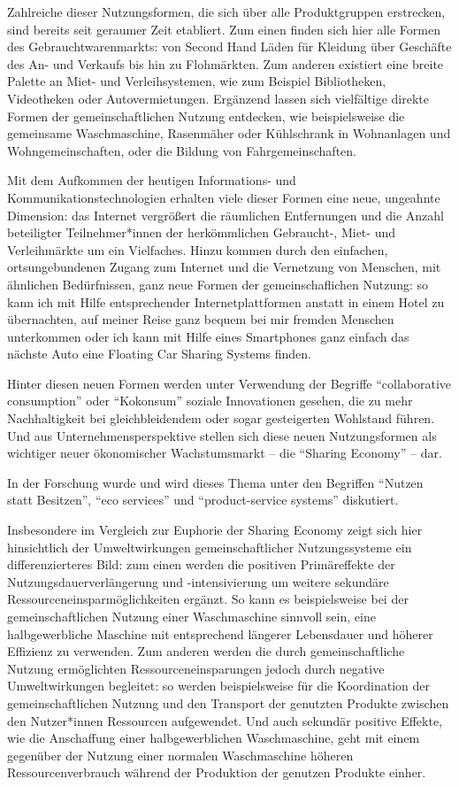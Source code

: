 \documentclass[11pt, titlepage=true]{scrartcl} %
\begin{document}
Zahlreiche dieser Nutzungsformen, die sich über alle Produktgruppen erstrecken,
sind bereits seit geraumer Zeit etabliert. Zum
einen finden sich hier alle Formen des Gebrauchtwarenmarkts: von Second Hand
Läden für Kleidung über Geschäfte des An- und Verkaufs bis hin zu Flohmärkten.
Zum anderen existiert eine breite Palette an Miet- und Verleihsystemen, wie zum
Beispiel Bibliotheken, Videotheken oder Autovermietungen. Ergänzend lassen sich
vielfältige direkte Formen der gemeinschaftlichen Nutzung entdecken, wie
beispielsweise die gemeinsame Waschmaschine, Rasenmäher oder Kühlschrank in
Wohnanlagen und Wohngemeinschaften, oder die Bildung von Fahrgemeinschaften.

Mit dem Aufkommen der heutigen Informations- und Kommunikationstechnologien
erhalten viele dieser Formen eine neue, ungeahnte Dimension: das Internet
vergrößert die räumlichen Entfernungen und die Anzahl beteiligter
Teilnehmer*innen der herkömmlichen Gebraucht-, Miet- und Verleihmärkte um ein
Vielfaches. Hinzu kommen durch den einfachen, ortsungebundenen Zugang zum
Internet und die Vernetzung von Menschen, mit ähnlichen Bedürfnissen, ganz neue
Formen der gemeinschaflichen Nutzung: so kann ich mit Hilfe entsprechender
Internetplattformen anstatt in einem Hotel zu übernachten,
auf meiner Reise ganz bequem bei mir fremden Menschen unterkommen oder
ich kann mit Hilfe eines Smartphones ganz einfach das nächste Auto eine Floating
Car Sharing Systems  finden.

Hinter diesen neuen Formen werden unter Verwendung der Begriffe
\enquote{collaborative consumption} oder \enquote{Kokonsum} soziale Innovationen
gesehen, die zu mehr Nachhaltigkeit bei gleichbleidendem oder sogar gesteigerten
Wohlstand führen. Und aus Unternehmensperspektive stellen sich diese neuen
Nutzungsformen als wichtiger neuer
ökonomischer Wachstumsmarkt -- die \enquote{Sharing Economy} -- dar.

In der Forschung wurde und wird dieses Thema unter den Begriffen \enquote{Nutzen
statt Besitzen}, \enquote{eco services} und \enquote{product-service systems}
diskutiert. 

Insbesondere im Vergleich zur Euphorie der Sharing Economy zeigt sich hier
hinsichtlich der Umweltwirkungen gemeinschaftlicher Nutzungssysteme ein
differenzierteres Bild: zum einen werden die positiven Primäreffekte der
Nutzungsdauerverlängerung und -intensivierung um weitere sekundäre
Ressourceneinsparmöglichkeiten ergänzt. So kann es beispielsweise bei der
gemeinschaftlichen Nutzung einer Waschmaschine sinnvoll sein, eine
halbgewerbliche Maschine mit entsprechend längerer Lebensdauer und höherer
Effizienz zu verwenden. Zum anderen werden die durch gemeinschaftliche Nutzung
ermöglichten Ressourceneinsparungen jedoch durch negative Umweltwirkungen
begleitet: so werden beispielsweise für die Koordination der gemeinschaftlichen
Nutzung und den Transport der genutzten Produkte zwischen den Nutzer*innen
Ressourcen aufgewendet. Und auch sekundär positive Effekte, wie die Anschaffung
einer halbgewerblichen Waschmaschine, geht mit einem gegenüber der Nutzung einer
normalen Waschmaschine höheren Ressourcenverbrauch während der Produktion der
genutzen Produkte einher. 
\end{document}
